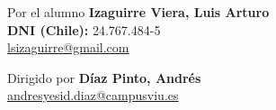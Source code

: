 \begin{flushright}
	Por el alumno
	\textbf{Izaguirre Viera, Luis Arturo}
	\\
	
	\textbf{DNI (Chile):} 24.767.484-5\\
	\href{lsizaguirre@gmail.com}{lsizaguirre@gmail.com}\\
	\vspace*{1cm}
	
	Dirigido por
	\textbf{Díaz Pinto, Andrés}
	\\
	\href{andresyesid.diaz@campusviu.es}{andresyesid.diaz@campusviu.es}\\
\end{flushright}

\newpage


